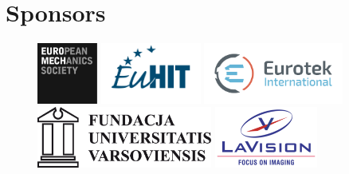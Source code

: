 \section*{Sponsors}
\begin{figure}[H]%
	\centering
	\includegraphics[height=2cm,keepaspectratio]{logo_spons/logoEUROMECH}\hfill
	\includegraphics[height=2cm,keepaspectratio]{logo_spons/EuHIT+logo+navy}\hfill
	\includegraphics[height=2cm,keepaspectratio]{logo_spons/logo_Eurotec_kolor}\hfill
	\includegraphics[height=2cm,keepaspectratio]{logo_spons/UV_logo}\hfill
	\includegraphics[height=2cm,keepaspectratio]{logo_spons/La_vision_logo}~%
\end{figure}

